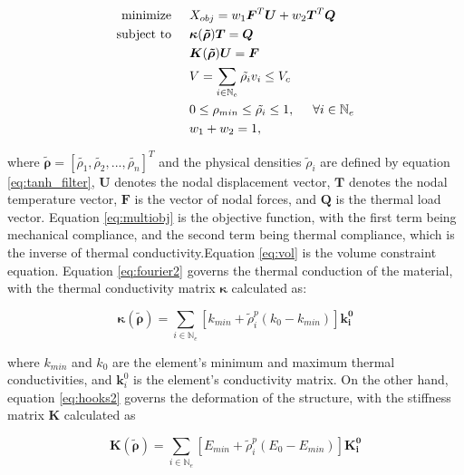 \documentclass[../main.tex]{subfiles}
\begin{document}
\begin{align}
  \text{minimize}  & \hspace{0.5cm} X_{obj} = w_1 \bm{F}^T \bm{U} + w_2 \bm{T}^T \bm{Q}  \label{eq:multiobj}\\ 
  \text{subject to} & \hspace{0.5cm} \bm{\kappa}(\bm{\tilde{\rho}}) \bm{T} = \bm{Q} \label{eq:fourier2} \\
                    &  \hspace{0.5cm} \bm{K}(\bm{\tilde{\rho}}){\bm{U}} = \bm{F} \label{eq:hooks2} \\
    & \hspace{0.5cm} V = \sum _{i \in \mathbb{N}_e } \tilde{\rho_i} v_i \leq V_c \label{eq:vol} \\ 
    & \hspace{0.5cm} 0 \leq \rho_{min} \leq \tilde{\rho_i} \leq 1, \hspace{0.5cm} \forall i \in \mathbb{N}_e  \\
    & \hspace{0.5cm} w_1 + w_2 = 1,  
 \end{align}

 where $\bm{\tilde{\rho}} = [\tilde{\rho_1}, \tilde{\rho_2}, ... , \tilde{\rho_n}]^T$ and the physical densities $\tilde{\rho}_i$ are defined by equation \ref{eq:tanh_filter}, $\bm{U}$ denotes the nodal displacement vector, $\bm{T}$ denotes the nodal temperature vector, $\bm{F}$ is the vector of nodal forces, and $\bm{Q}$ is the thermal load vector. Equation \ref{eq:multiobj} is the objective function, with the first term being mechanical compliance, and the second term being thermal compliance, which is the inverse of thermal conductivity.Equation \ref{eq:vol} is the volume constraint equation. Equation \ref{eq:fourier2} governs the thermal conduction of the material, with the thermal conductivity matrix $\bm{\kappa}$ calculated as:

\begin{equation}
  \bm{\kappa}(\bm{\tilde{\rho}}) = \sum_{i \in \mathbb{N}_e}[k_{min} + \tilde{\rho}_i^p(k_0 - k_{min})]\bm{k_i^0}
\label{eq:globalcond}
\end{equation}

where $k_{min}$ and $k_0$ are the element's minimum and maximum thermal conductivities, and $\bm{k}_i^0$ is the element's conductivity matrix. On the other hand, equation \ref{eq:hooks2} governs the deformation of the structure, with the stiffness matrix $\bm{K}$ calculated as

\begin{equation}
  \bm{K}(\bm{\tilde{\rho}}) = \sum_{i \in \mathbb{N}_e}[E_{min} + \tilde{\rho}_i^p(E_0 - E_{min})]\bm{K_i^0}
\label{eq:globalstiff}
\end{equation}
\end{document}
